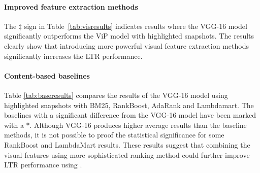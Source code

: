 \paragraph{Improved feature extraction methods}
The $\ddagger$ sign in Table~\ref{tab:visresults} indicates results where the VGG-16 model significantly outperforms the ViP model with highlighted snapshots. The results clearly show that introducing more powerful visual feature extraction methods significantly increases the \ac{LTR} performance.

\paragraph{Content-based baselines}
Table \ref{tab:baseresults} compares the results of the VGG-16 model using highlighted snapshots with BM25, RankBoost, AdaRank and Lambdamart. The baselines with a significant difference from the VGG-16 model have been marked with a $*$. Although VGG-16 produces higher average results than the baseline methods, it is not possible to proof the statistical significance for some RankBoost and LambdaMart results. These results suggest that combining the visual features using more sophisticated ranking method could further improve \ac{LTR} performance using \datasetname. 


